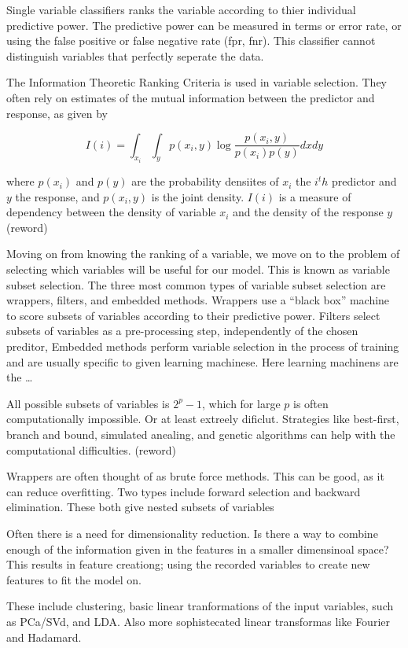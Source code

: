 \documentclass[12pt,twoside]{reedthesis}
\theoremstyle{definition}
\theoremstyle{definition}
\theoremstyle{definition}
\theoremstyle{remark}
\begin{document}
Single variable classifiers ranks the variable according to thier
individual predictive power. The predictive power can be measured in
terms or error rate, or using the false positive or false negative rate
(fpr, fnr). This classifier cannot distinguish variables that perfectly
seperate the data.

The Information Theoretic Ranking Criteria is used in variable
selection. They often rely on estimates of the mutual information
between the predictor and response, as given by

\[ I(i) = \int_{x_i}\int_yp(x_i,y)\log\frac{p(x_i,y)}{p(x_i)p(y)}dxdy\]

where \(p(x_i)\) and \(p(y)\) are the probability densiites of \(x_i\)
the \(i^th\) predictor and \(y\) the response, and \(p(x_i,y)\) is the
joint density. \(I(i)\) is a measure of dependency between the density
of variable \(x_i\) and the density of the response \(y\) (reword)

Moving on from knowing the ranking of a variable, we move on to the
problem of selecting which variables will be useful for our model. This
is known as variable subset selection. The three most common types of
variable subset selection are wrappers, filters, and embedded methods.
Wrappers use a ``black box'' machine to score subsets of variables
according to their predictive power. Filters select subsets of variables
as a pre-processing step, independently of the chosen preditor, Embedded
methods perform variable selection in the process of training and are
usually specific to given learning machinese. Here learning machinens
are the \ldots{}

All possible subsets of variables is \(2^p-1\), which for large \(p\) is
often computationally impossible. Or at least extreely dificlut.
Strategies like best-first, branch and bound, simulated anealing, and
genetic algorithms can help with the computational difficulties.
(reword)

Wrappers are often thought of as brute force methods. This can be good,
as it can reduce overfitting. Two types include forward selection and
backward elimination. These both give nested subsets of variables

Often there is a need for dimensionality reduction. Is there a way to
combine enough of the information given in the features in a smaller
dimensinoal space? This results in feature creationg; using the recorded
variables to create new features to fit the model on.

These include clustering, basic linear tranformations of the input
variables, such as PCa/SVd, and LDA. Also more sophistecated linear
transformas like Fourier and Hadamard.
\end{document}
